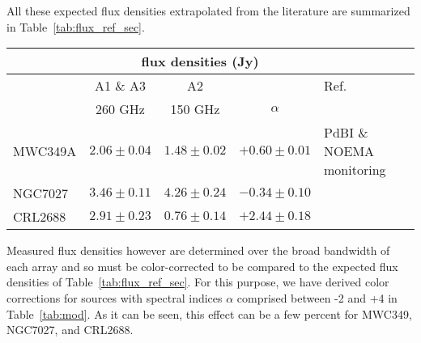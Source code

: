 All these expected flux densities extrapolated from the literature are
summarized in Table~\ref{tab:flux_ref_sec}.


\begin{table*}[!thbp]
  \caption[Reference flux densities of secondary calibrators]{Reference flux densities of secondary calibrators at the NIKA2 reference frequencies 150 and 260 GHz. Uncertainties of flux densities extrapolated
    at 150 and 260 GHz include contribution of the uncertainty on the spectral index $\alpha$, which is defined as $S_{\nu} \propto \nu^{\alpha}$.}
  \label{tab:flux_ref_sec}
  \centering    
  \begin{tabular}{|l|c|c|c|l|}
    \hline\hline
    \multicolumn{1}{|c}{}  & \multicolumn{3}{|c}{flux  densities (Jy)} & \multicolumn{1}{|c|}{}  \\
    \hline
    &    A1 \& A3       &  A2             &            &   Ref. \\
    &  260 GHz          &  150 GHz        & $\alpha$ &      \\
    \hline
    MWC349A   &   $2.06\pm0.04$  &  $1.48\pm0.02$ &  $+0.60\pm0.01$      &  PdBI \& NOEMA monitoring  \\
    NGC7027  &   $3.46\pm0.11$   &  $4.26\pm0.24$  &  $-0.34\pm0.10$     &  \citet{Hoare1992}      \\
    CRL2688  &   $2.91\pm0.23$   &  $0.76\pm0.14$  &  $+2.44\pm0.18$     &  \citet{Dempsey2013_SCUBA2} \\
    \hline
  \end{tabular}
\end{table*}


Measured flux densities however are determined over the broad
bandwidth of each array and so must be color-corrected to be compared
to the expected flux densities of Table~\ref{tab:flux_ref_sec}.  For
this purpose, we have derived color corrections for sources with spectral
indices $\alpha$ comprised between -2 and +4 in Table~\ref{tab:mod}. %
As it can be seen, this effect can be a few percent for MWC349, NGC7027, and CRL2688.

